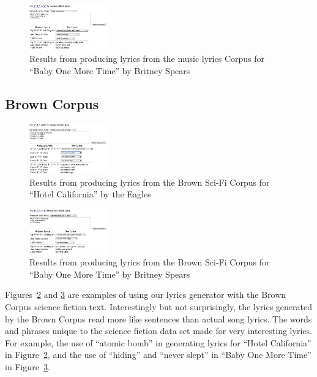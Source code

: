 \documentclass{vgtc}                          %
\begin{document}
\begin{figure}[t]
\centering
\includegraphics[width=0.3\textwidth]{images/png/hmbomt4.png}
\caption{Results from producing lyrics from the music lyrics Corpus for ``Baby One More Time'' by
Britney Spears}
\label{fig:britney}
\end{figure}


\subsection{Brown Corpus}

\begin{figure}[t]
\centering
\includegraphics[width=0.3\textwidth]{images/png/hotel_california5.png}
\caption{Results from producing lyrics from the Brown Sci-Fi Corpus for ``Hotel California'' by the
Eagles}
\label{fig:eagles}
\end{figure}

\begin{figure}[t]
\centering
\includegraphics[width=0.3\textwidth]{images/png/hmbomt3.png}
\caption{Results from producing lyrics from the Brown Sci-Fi Corpus for ``Baby One More Time'' by
Britney Spears}
\label{fig:britney2}
\end{figure}

Figures~\ref{fig:eagles} and \ref{fig:britney2} are examples of using our lyrics generator
with the Brown Corpus science fiction text. Interestingly but not surprisingly,
the lyrics generated by the Brown Corpus read more like sentences than actual
song lyrics. The words and phrases unique to the science fiction data set
made for very interesting lyrics. For example, the use of ``atomic bomb''
in generating lyrics for ``Hotel California'' in Figure~\ref{fig:eagles},
and the use of ``hiding'' and ``never slept'' in ``Baby One More Time''
in Figure~\ref{fig:britney2}.
\end{document}
